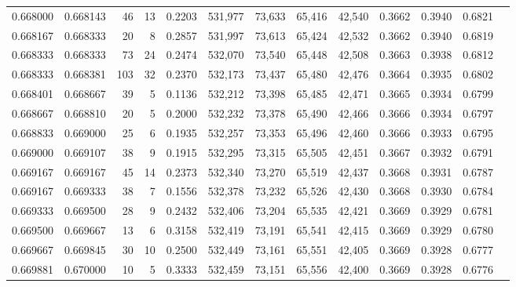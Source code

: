 \begin{tabular}{rrrrrrrrrrrrr}
0.668000 & 0.668143 &    46 &  13 &                                     0.2203 & 531,977 &  73,633 &  65,416 &  42,540 & 0.3662 & 0.3940 & 0.6821 \\
0.668167 & 0.668333 &    20 &   8 &                                     0.2857 & 531,997 &  73,613 &  65,424 &  42,532 & 0.3662 & 0.3940 & 0.6819 \\
0.668333 & 0.668333 &    73 &  24 &                                     0.2474 & 532,070 &  73,540 &  65,448 &  42,508 & 0.3663 & 0.3938 & 0.6812 \\
0.668333 & 0.668381 &   103 &  32 &                                     0.2370 & 532,173 &  73,437 &  65,480 &  42,476 & 0.3664 & 0.3935 & 0.6802 \\
0.668401 & 0.668667 &    39 &   5 &                                     0.1136 & 532,212 &  73,398 &  65,485 &  42,471 & 0.3665 & 0.3934 & 0.6799 \\
0.668667 & 0.668810 &    20 &   5 &                                     0.2000 & 532,232 &  73,378 &  65,490 &  42,466 & 0.3666 & 0.3934 & 0.6797 \\
0.668833 & 0.669000 &    25 &   6 &                                     0.1935 & 532,257 &  73,353 &  65,496 &  42,460 & 0.3666 & 0.3933 & 0.6795 \\
0.669000 & 0.669107 &    38 &   9 &                                     0.1915 & 532,295 &  73,315 &  65,505 &  42,451 & 0.3667 & 0.3932 & 0.6791 \\
0.669167 & 0.669167 &    45 &  14 &                                     0.2373 & 532,340 &  73,270 &  65,519 &  42,437 & 0.3668 & 0.3931 & 0.6787 \\
0.669167 & 0.669333 &    38 &   7 &                                     0.1556 & 532,378 &  73,232 &  65,526 &  42,430 & 0.3668 & 0.3930 & 0.6784 \\
0.669333 & 0.669500 &    28 &   9 &                                     0.2432 & 532,406 &  73,204 &  65,535 &  42,421 & 0.3669 & 0.3929 & 0.6781 \\
0.669500 & 0.669667 &    13 &   6 &                                     0.3158 & 532,419 &  73,191 &  65,541 &  42,415 & 0.3669 & 0.3929 & 0.6780 \\
0.669667 & 0.669845 &    30 &  10 &                                     0.2500 & 532,449 &  73,161 &  65,551 &  42,405 & 0.3669 & 0.3928 & 0.6777 \\
0.669881 & 0.670000 &    10 &   5 &                                     0.3333 & 532,459 &  73,151 &  65,556 &  42,400 & 0.3669 & 0.3928 & 0.6776 \\

\end{tabular}
